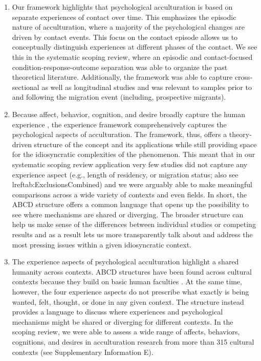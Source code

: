 \documentclass[man, 12pt, a4paper, mask]{apa7}
\begin{document}
\begin{enumerate}
\item Our framework highlights that psychological acculturation is based on separate experiences of contact over time. This emphasizes the episodic nature of acculturation, where a majority of the psychological changes are driven by contact events. This focus on the contact episode allows us to conceptually distinguish experiences at different phases of the contact. We see this in the systematic scoping review, where an episodic and contact-focused condition-response-outcome separation was able to organize the past theoretical literature. Additionally, the framework was able to capture cross-sectional as well as longitudinal studies and was relevant to samples prior to and following the migration event (including, prospective migrants). 

\item Because affect, behavior, cognition, and desire broadly capture the human experience \citep[e.g.,][]{Jhangiani2014}, the experience framework comprehensively captures the psychological aspects of acculturation. The framework, thus, offers a theory-driven structure of the concept and its applications while still providing space for the idiosyncratic complexities of the phenomenon. This meant that in our systematic scoping review application very few studies did not capture any experience aspect (e.g., length of residency, or migration status; also see lref{tab:ExclusionsCombined}) and we were arguably able to make meaningful comparisons across a wide variety of contexts and even fields. In short, the ABCD structure offers a common language that opens up the possibility to see where mechanisms are shared or diverging. The broader structure can help us make sense of the differences between individual studies or competing results and as a result lets us more transparently talk about and address the most pressing issues within a given idiosyncratic context.

\item The experience aspects of psychological acculturation highlight a shared humanity across contexts. ABCD structures have been found across cultural contexts because they build on basic human faculties \citep[e.g.,][]{Bhawuk2011}. At the same time, however, the four experience aspects do not prescribe what exactly is being wanted, felt, thought, or done in any given context. The structure instead provides a language to discuss where experiences and psychological mechanisms might be shared or diverging for different contexts. In the scoping review, we were able to assess a wide range of affects, behaviors, cognitions, and desires in acculturation research from more than 315 cultural contexts (see Supplementary Information E).


\end{enumerate}
\end{document}
